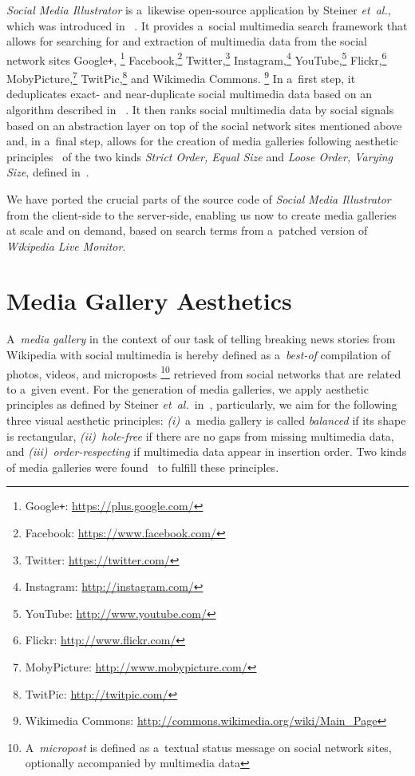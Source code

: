 \documentclass{sig-alternate}
\newcommand{\inlinelistingsize}{\fontsize{8pt}{11pt}}
\let\oldurl\url
\renewcommand{\url}[1]{\inlinelistingsize\oldurl{#1}}
\begin{document}
\emph{Social Media Illustrator} is a~likewise
open-source application by Steiner \emph{et~al.},
which was introduced in%
~\cite{steiner2013meteoroid,steiner2013tocrop}.
It provides a~social multimedia search framework
that allows for searching for and extraction of
multimedia data from the social network sites
Google\texttt{+},%
\footnote{Google\texttt{+}: \url{https://plus.google.com/}}
Facebook,\footnote{Facebook: \url{https://www.facebook.com/}}
Twitter,\footnote{Twitter: \url{https://twitter.com/}}
Instagram,\footnote{Instagram: \url{http://instagram.com/}}
YouTube,\footnote{YouTube: \url{http://www.youtube.com/}}
Flickr,\footnote{Flickr: \url{http://www.flickr.com/}}
MobyPicture,\footnote{MobyPicture: \url{http://www.mobypicture.com/}}
TwitPic,\footnote{TwitPic: \url{http://twitpic.com/}}
and Wikimedia Commons.%
\footnote{Wikimedia Commons: \url{http://commons.wikimedia.org/wiki/Main_Page}}
In a~first step, it deduplicates exact- and near-duplicate
social multimedia data based on an algorithm described in%
~\cite{steiner2013clustering}.
It then ranks social multimedia data by social signals%
~\cite{steiner2013meteoroid} based on an abstraction layer
on top of the social network sites mentioned above
and, in a~final step, allows for the creation of media galleries
following aesthetic principles~\cite{steiner2012aesthetic}
of the two kinds \emph{Strict Order, Equal Size}
and \emph{Loose Order, Varying Size},
defined in~\cite{steiner2013tocrop}.

We have ported the crucial parts
of the source code of \emph{Social Media Illustrator}
from the client-side to the server-side,
enabling us now to create media galleries at scale and on demand,
based on search terms from a~patched version of \emph{Wikipedia Live Monitor}.

\section{Media Gallery Aesthetics}
\label{sec:media-gallery-aesthetics}
\selectfont

A~\emph{media gallery} in the context of our task of
telling breaking news stories from Wikipedia with social multimedia
is hereby defined as a~\emph{best-of} compilation of photos, videos,
and microposts%
\footnote{A~\emph{micropost} is defined as a~textual status message
on social network sites, optionally accompanied by multimedia data}
retrieved from social networks that are related to a~given event.
For the generation of media galleries, we apply aesthetic principles
as defined by Steiner \emph{et~al.}\
in~\cite{steiner2013tocrop,steiner2012aesthetic},
particularly, we aim for the following
three visual aesthetic principles:
\emph{(i)}~a~media gallery is called \emph{balanced}
if its shape is rectangular,
\emph{(ii)}~\emph{hole-free}
if there are no gaps from missing multimedia data,
and \emph{(iii)}~\emph{order-respecting}
if multimedia data appear in insertion order.
Two kinds of media galleries were found~\cite{steiner2013tocrop}
to fulfill these principles.
\end{document}
